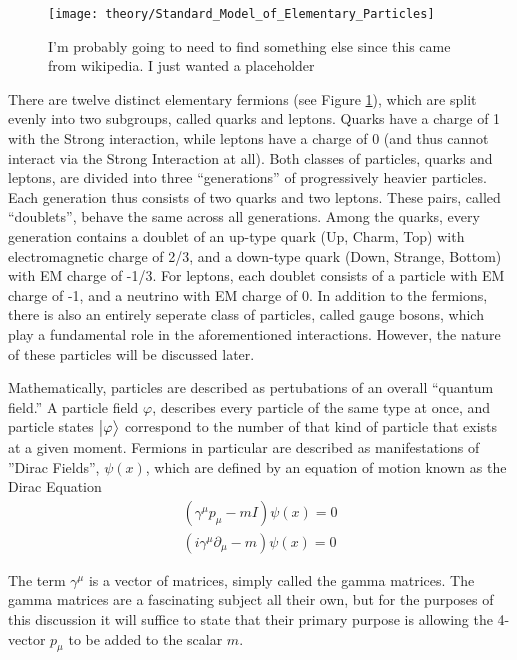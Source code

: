     \begin{figure}[h!]
        \texttt{[image: theory/Standard\_Model\_of\_Elementary\_Particles]}
        \caption{I'm probably going to need to find something else since this came from wikipedia. I just wanted a placeholder}
        \label{fig:sm_particles}
    \end{figure}

    There are twelve distinct elementary fermions (see Figure \ref{fig:sm_particles}),
        which are split evenly into two subgroups, called quarks and leptons.
    Quarks have a charge of 1 with the Strong interaction,
        while leptons have a charge of 0 (and thus cannot interact via the Strong Interaction at all).
    Both classes of particles, quarks and leptons, are divided into three ``generations'' of progressively heavier particles.
    Each generation thus consists of two quarks and two leptons.
    These pairs, called ``doublets'', behave the same across all generations.
    Among the quarks, every generation contains a doublet of an up-type quark (Up, Charm, Top) with electromagnetic charge of 2/3,
        and a down-type quark (Down, Strange, Bottom) with EM charge of -1/3.
    For leptons, each doublet consists of a particle with EM charge of -1, and a neutrino with EM charge of 0.
    In addition to the fermions, there is also an entirely seperate class of particles, called gauge bosons,
        which play a fundamental role in the aforementioned interactions.
    However, the nature of these particles will be discussed later.

    Mathematically, particles are described as pertubations of an overall ``quantum field.''
    A particle field $\varphi$, describes every particle of the same type at once,
        and particle states $\big| \varphi \big>$ correspond to the number of that kind of particle that exists at a given moment.
    Fermions in particular are described as manifestations of ''Dirac Fields'', $\psi(x)$,
        which are defined by an equation of motion known as the Dirac Equation
    \begin{equation} \begin{split}
        (\gamma^\mu p_\mu - m I) \psi(x) = 0
        \\ (i\gamma^\mu \partial_\mu  - m) \psi(x) = 0
    \end{split} \end{equation}

    The term $\gamma^\mu$ is a vector of matrices, simply called the gamma matrices.
    The gamma matrices are a fascinating subject all their own, 
        but for the purposes of this discussion it will suffice to state that their primary purpose is allowing 
        the 4-vector $p_\mu$ to be added to the scalar $m$. %

